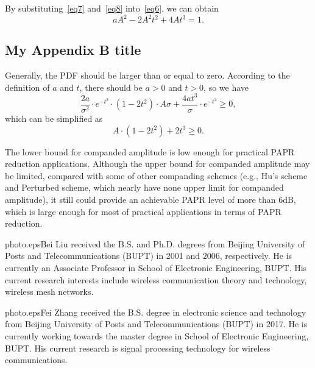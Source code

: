 \documentclass{ccjnl}
\begin{document}
By substituting~\eqref{eq7} and~\eqref{eq8} into~\eqref{eq6}, we can obtain
\begin{equation}
a{A^2} - 2{A^2}{t^2} + 4A{t^3}= 1.
\label{eqa1}
\end{equation}

\subsection{My Appendix B title}

Generally, the PDF should be larger than or equal to zero. According to the definition of $a$ and $t$, there should be $a > 0$ and $t > 0$, so we have
\begin{equation}
\frac{{2a}}{{{\sigma ^2}}} \cdot {e^{ - {t^2}}} \cdot \left( {1 - 2{t^2}} \right) \cdot A\sigma  + \frac{{4a{t^3}}}{\sigma } \cdot {e^{ - {t^2}}} \geqslant 0,
\label{eqa2}
\end{equation}
which can be simplified as  
\begin{equation}
A \cdot \left( {1 - 2{t^2}} \right) + 2{t^3} \geqslant 0.
\label{eqa3}
\end{equation}

The lower bound for companded amplitude is low enough for practical PAPR reduction applications. Although the upper bound for companded amplitude may be limited, compared with some of other companding schemes (e.g., Hu's scheme and Perturbed scheme, which nearly have none upper limit for companded amplitude), it still could provide an achievable PAPR level of more than 6dB, which is large enough for most of practical applications in terms of PAPR reduction.




\biographies

\begin{CCJNLbiography}{photo.eps}{Bei Liu}
received the B.S. and Ph.D. degrees from Beijing University of Posts and Telecommunications (BUPT) in 2001 and 2006, respectively. He is currently an Associate Professor in School of Electronic Engineering, BUPT. His current research interests include wireless communication theory and technology, wireless mesh networks.
\end{CCJNLbiography}

\begin{CCJNLbiography}{photo.eps}{Fei Zhang}
received the B.S. degree in electronic science and technology from Beijing University of Posts and Telecommunications (BUPT) in 2017. He is currently working towards the master degree in School of Electronic Engineering, BUPT. His current research is signal processing technology for wireless communications.
\end{CCJNLbiography}
\end{document}
